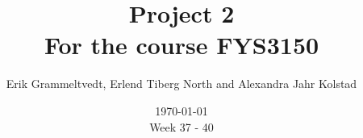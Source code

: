\documentclass{article}
\begin{document}
\addtocounter{page}{0}

\title{Project 2 \\
      \large For the course FYS3150}
\date{\today \\
    \vspace{1mm}
    \large Week 37 - 40}

\author{Erik Grammeltvedt, Erlend Tiberg North and Alexandra Jahr Kolstad}

\maketitle


\vspace{1cm}

\tableofcontents

\vspace{1cm}
\end{document}
